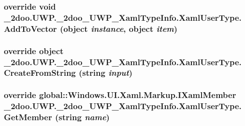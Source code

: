 \hypertarget{class__2doo_1_1_u_w_p_1_1__2doo___u_w_p___xaml_type_info_1_1_xaml_user_type_1c07d6c6feef7aa2b0e63b5dd9be9a13}{
\subsubsection[{AddToVector}]{\setlength{\rightskip}{0pt plus 5cm}override void \_\-2doo.UWP.\_\-2doo\_\-UWP\_\-XamlTypeInfo.XamlUserType.AddToVector (object {\em instance}, \/  object {\em item})}}
\label{class__2doo_1_1_u_w_p_1_1__2doo___u_w_p___xaml_type_info_1_1_xaml_user_type_1c07d6c6feef7aa2b0e63b5dd9be9a13}


\hypertarget{class__2doo_1_1_u_w_p_1_1__2doo___u_w_p___xaml_type_info_1_1_xaml_user_type_7db1396b8a749cba22b5d726ee00804d}{
\subsubsection[{CreateFromString}]{\setlength{\rightskip}{0pt plus 5cm}override object \_\-2doo.UWP.\_\-2doo\_\-UWP\_\-XamlTypeInfo.XamlUserType.CreateFromString (string {\em input})}}
\label{class__2doo_1_1_u_w_p_1_1__2doo___u_w_p___xaml_type_info_1_1_xaml_user_type_7db1396b8a749cba22b5d726ee00804d}


\hypertarget{class__2doo_1_1_u_w_p_1_1__2doo___u_w_p___xaml_type_info_1_1_xaml_user_type_a8245789e313c64bc2c8575e2fd66dbb}{
\subsubsection[{GetMember}]{\setlength{\rightskip}{0pt plus 5cm}override global::Windows.UI.Xaml.Markup.IXamlMember \_\-2doo.UWP.\_\-2doo\_\-UWP\_\-XamlTypeInfo.XamlUserType.GetMember (string {\em name})}}
\label{class__2doo_1_1_u_w_p_1_1__2doo___u_w_p___xaml_type_info_1_1_xaml_user_type_a8245789e313c64bc2c8575e2fd66dbb}


